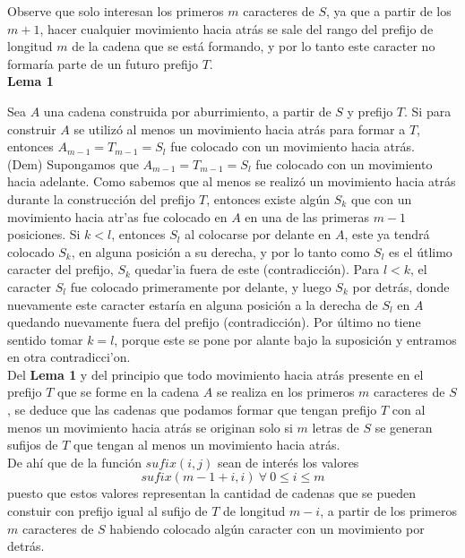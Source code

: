 \documentclass[a4paper]{article}
\begin{document}
    Observe que solo interesan los primeros $m$ caracteres de $S$, ya que a partir de los $m+1$,
    hacer cualquier movimiento hacia atr\'as se sale del rango del prefijo de longitud $m$ de la
    cadena que se est\'a formando, y por lo tanto este caracter no formar\'ia parte de un
    futuro prefijo $T$. \\

    \textbf{Lema 1}

    Sea $A$ una cadena construida por aburrimiento, a partir de $S$ y prefijo $T$.
    Si para construir $A$ se utiliz\'o al menos un movimiento hacia atr\'as para formar a $T$,
    entonces $A_{m-1} = T_{m-1} = S_{l}$ fue colocado con un movimiento hacia atr\'as. \\
    
    (Dem) Supongamos que $A_{m-1} = T_{m-1} = S_{l}$ fue colocado con un movimiento hacia adelante.
    Como sabemos que al menos se realiz\'o un movimiento hacia atr\'as durante la construcci\'on
    del prefijo $T$, entonces existe alg\'un $S_{k}$ que con un movimiento hacia atr'as fue colocado
    en $A$ en una de las primeras $m-1$ posiciones. Si $k<l$, entonces $S_l$ al colocarse por delante
    en $A$, este ya tendr\'a colocado $S_k$, en alguna posici\'on a su derecha, y por lo tanto
    como $S_l$ es el \'utlimo caracter del prefijo, $S_k$ quedar'ia fuera de este (contradicci\'on).
    Para $l<k$, el caracter $S_l$ fue colocado primeramente por delante, y luego $S_k$ por detr\'as,
    donde nuevamente este caracter estar\'ia en alguna posici\'on a la derecha de $S_l$ en $A$
    quedando nuevamente fuera del prefijo (contradicci\'on).
    Por \'ultimo no tiene sentido tomar $k=l$, porque este se pone por alante bajo la suposici\'on
    y entramos en otra contradicci'on.\\

    Del \textbf{Lema 1} y del principio que todo movimiento hacia atr\'as presente en el prefijo $T$ que se forme en la 
    cadena $A$ se realiza en los primeros $m$ caracteres de $S$, se deduce que las cadenas que podamos formar que tengan prefijo $T$ con al menos un 
    movimiento hacia atr\'as se originan solo si $m$ letras de $S$ se generan sufijos de $T$ que tengan al menos un movimiento hacia atr\'as. \\

    De ah\'i que de la funci\'on $sufix(i,j)$ sean de inter\'es los valores $$sufix(m -1 +i, i)~ \forall~0 \leq i \leq m$$ puesto que estos valores representan la cantidad
    de cadenas que se pueden constuir con prefijo igual al sufijo de $T$ de longitud $m-i$, a partir de los primeros $m$ caracteres de $S$ habiendo colocado alg\'un caracter con un
    movimiento por detr\'as.\\
\end{document}
